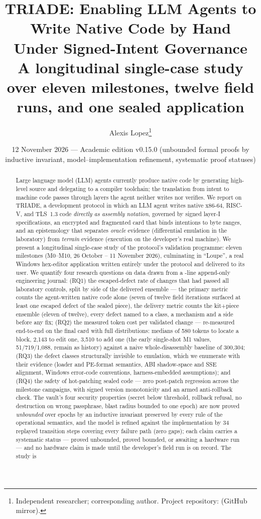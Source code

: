 \documentclass[11pt,a4paper]{article}
\title{\textbf{TRIADE: Enabling LLM Agents to Write Native Code by Hand\\
Under Signed-Intent Governance\\
\large A longitudinal single-case study over eleven milestones, twelve field
runs, and one sealed application}}
\author{Alexis Lopez\thanks{Independent researcher; corresponding author.
Project repository: \code{alexisfrlopez-debug/triade} (GitHub mirror).}}
\date{12 November 2026 — Academic edition v0.15.0 (unbounded formal proofs by inductive invariant, model--implementation refinement, systematic proof statuses)}
\begin{document}
\maketitle
\thispagestyle{fancy}

\begin{abstract}
\noindent Large language model (LLM) agents currently produce native code by
generating high-level source and delegating to a compiler toolchain; the
translation from intent to machine code passes through layers the agent
neither writes nor verifies. We report on TRIADE, a development protocol in
which an LLM agent writes native x86-64, RISC-V, and TLS~1.3 code
\emph{directly as assembly notation}, governed by signed layer-I
specifications, an encrypted and fragmented card that binds intentions to
byte ranges, and an epistemology that separates \emph{oracle} evidence
(differential emulation in the laboratory) from \emph{terrain} evidence
(execution on the developer's real machine). We present a longitudinal
single-case study of the protocol's validation programme: eleven milestones
(M0--M10, 26 October -- 11 November 2026), culminating in ``Loupe'', a real
Windows hex-editor application written entirely under the protocol and
delivered to its user. We quantify four research questions on data drawn
from a \nbLignesJournal-line append-only engineering journal: (RQ1) the
escaped-defect rate of changes that had passed all laboratory controls,
split by side of the delivered ensemble --- the primary metric counts
the agent-written native code alone (seven of twelve field iterations
surfaced at least one escaped defect of the sealed piece), the delivery
metric counts the kit+piece ensemble (eleven of twelve), every defect
named to a class, a mechanism and a side before any fix; (RQ2) the measured
token cost per validated change --- re-measured end-to-end on the final
card with full distributions: medians of 580 tokens to locate a block,
2{,}143 to edit one, 3{,}510 to add one (the early single-shot M1 values,
51/719/1{,}088, remain as history) against a naive whole-disassembly
baseline of 300{,}304;
(RQ3) the defect classes structurally invisible to emulation, which we
enumerate with their evidence (loader and PE-format semantics, ABI
shadow-space and SSE alignment, Windows error-code conventions,
harness-embedded assumptions); and (RQ4) the safety of hot-patching sealed
code --- zero post-patch regression across the milestone campaigns, with
signed version monotonicity and an armed anti-rollback check. The vault's four security properties (secret below threshold, rollback refusal, no destruction on wrong passphrase, blast radius bounded to one epoch) are now proved \emph{unbounded} over epochs by an inductive invariant preserved by every rule of the operational semantics, and the model is refined against the implementation by 34 replayed transition steps covering every failure path (zero gaps); each claim carries a systematic status --- proved unbounded, proved bounded, or awaiting a hardware run --- and no hardware claim is made until the developer's field run is on record. The study is

\end{abstract}
\end{document}
